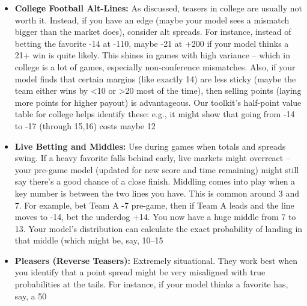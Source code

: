 \documentclass[11pt]{amsart}
\begin{document}
\begin{itemize}
    \item \textbf{College Football Alt-Lines:} As discussed, teasers in college are usually not worth it. Instead, if you have an edge (maybe your model sees a mismatch bigger than the market does), consider alt spreads. For instance, instead of betting the favorite -14 at -110, maybe -21 at +200 if your model thinks a 21+ win is quite likely. This shines in games with high variance – which in college is a lot of games, especially non-conference mismatches. Also, if your model finds that certain margins (like exactly 14) are less sticky (maybe the team either wins by <10 or >20 most of the time), then selling points (laying more points for higher payout) is advantageous. Our toolkit’s half-point value table for college helps identify these: e.g., it might show that going from -14 to -17 (through 15,16) costs maybe 12%
    \item \textbf{Live Betting and Middles:} Use during games when totals and spreads swing. If a heavy favorite falls behind early, live markets might overreact – your pre-game model (updated for new score and time remaining) might still say there’s a good chance of a close finish. Middling comes into play when a key number is between the two lines you have. This is common around 3 and 7. For example, bet Team A -7 pre-game, then if Team A leads and the line moves to -14, bet the underdog +14. You now have a huge middle from 7 to 13. Your model’s distribution can calculate the exact probability of landing in that middle (which might be, say, 10–15%
    \item \textbf{Pleasers (Reverse Teasers):} Extremely situational. They work best when you identify that a point spread might be very misaligned with true probabilities at the tails. For instance, if your model thinks a favorite has, say, a 50%
\end{itemize}
\end{document}
